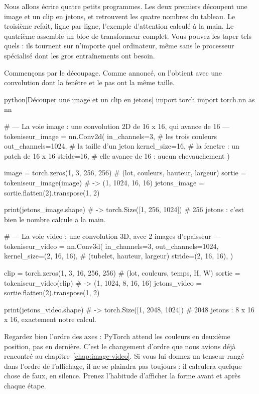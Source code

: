 Nous allons écrire quatre petits programmes. Les deux premiers découpent une
image et un clip en jetons, et retrouvent les quatre nombres du tableau. Le
troisième refait, ligne par ligne, l'exemple d'attention calculé à la main.
Le quatrième assemble un bloc de transformeur complet. Vous pouvez les taper
tels quels : ils tournent sur n'importe quel ordinateur, même sans le
processeur spécialisé dont les gros entraînements ont besoin.

Commençons par le découpage. Comme annoncé, on l'obtient avec une
convolution dont la fenêtre et le pas ont la même taille.

\begin{code}{python}[Découper une image et un clip en jetons]
import torch
import torch.nn as nn

# --- La voie image : une convolution 2D de 16 x 16, qui avance de 16 ---
tokeniseur_image = nn.Conv2d(
    in_channels=3,       # les trois couleurs
    out_channels=1024,   # la taille d'un jeton
    kernel_size=16,      # la fenetre : un patch de 16 x 16
    stride=16,           # elle avance de 16 : aucun chevauchement
)

image = torch.zeros(1, 3, 256, 256)          # (lot, couleurs, hauteur, largeur)
sortie = tokeniseur_image(image)             # -> (1, 1024, 16, 16)
jetons_image = sortie.flatten(2).transpose(1, 2)

print(jetons_image.shape)   # -> torch.Size([1, 256, 1024])
# 256 jetons : c'est bien le nombre calcule a la main.

# --- La voie video : une convolution 3D, avec 2 images d'epaisseur ---
tokeniseur_video = nn.Conv3d(
    in_channels=3,
    out_channels=1024,
    kernel_size=(2, 16, 16),   # (tubelet, hauteur, largeur)
    stride=(2, 16, 16),
)

clip = torch.zeros(1, 3, 16, 256, 256)       # (lot, couleurs, temps, H, W)
sortie = tokeniseur_video(clip)              # -> (1, 1024, 8, 16, 16)
jetons_video = sortie.flatten(2).transpose(1, 2)

print(jetons_video.shape)   # -> torch.Size([1, 2048, 1024])
# 2048 jetons : 8 x 16 x 16, exactement notre calcul.
\end{code}

\begin{piege}
Regardez bien l'ordre des axes : PyTorch attend les couleurs en deuxième
position, pas en dernière. C'est le changement d'ordre que nous avions déjà
rencontré au chapitre~\ref{chap:image-video}. Si vous lui donnez un tenseur
rangé dans l'ordre de l'affichage, il ne se plaindra pas toujours : il
calculera quelque chose de faux, en silence. Prenez l'habitude d'afficher la
forme avant et après chaque étape.
\end{piege}

